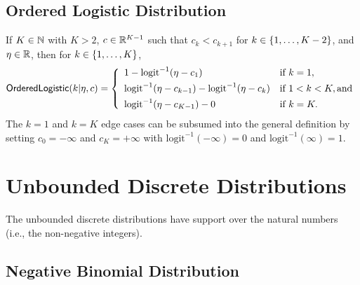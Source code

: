 \begin{description}
\end{description}

\subsection{Ordered Logistic Distribution}

If $K \in \mathbb{N}$ with $K > 2$, $c \in \mathbb{R}^{K-1}$ such that $c_k <
c_{k+1}$ for $k \in \{ 1,\ldots,K-2 \}$, and $\eta \in \mathbb{R}$, then for $k \in
\{ 1,\ldots,K \}$,
\[
\mbox{\sf OrderedLogistic}(k|\eta,c)
=
\left\{
\begin{array}{ll}
1 - \mbox{logit}^{-1}(\eta - c_1) & \mbox{if } k = 1,
\\[4pt]
\mbox{logit}^{-1}(\eta - c_{k-1}) - \mbox{logit}^{-1}(\eta -
c_{k})
& \mbox{if } 1 < k < K, \mbox{and}
\\[4pt]
\mbox{logit}^{-1}(\eta - c_{K-1}) - 0
& \mbox{if } k = K.
\end{array}
\right.
\]
%
The $k=1$ and $k=K$ edge cases can be subsumed into the general definition
by setting $c_0 = -\infty$ and $c_K = +\infty$ with
$\mbox{logit}^{-1}(-\infty) = 0$ and $\mbox{logit}^{-1}(\infty) = 1$.
%
\begin{description}
\end{description}


\section{Unbounded Discrete Distributions}

The unbounded discrete distributions have support over the natural
numbers (i.e., the non-negative integers).

\subsection{Negative Binomial Distribution}

